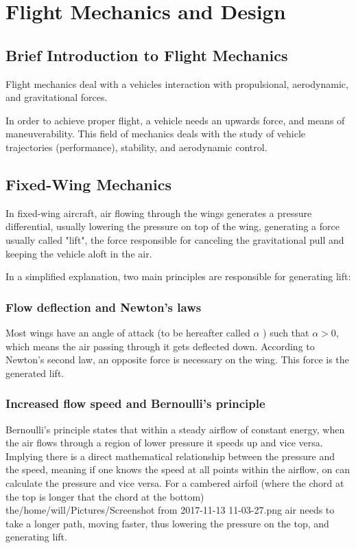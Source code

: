 
\chapter{Flight Mechanics and Design} \label{chap:FlightMechanics}

\section{Brief Introduction to Flight Mechanics}

Flight mechanics deal with a vehicles interaction with propulsional, aerodynamic, and gravitational forces.

In order to achieve proper flight, a vehicle needs an upwards force, and means of maneuverability. 
%
This field of mechanics deals with the study of vehicle trajectories (performance), stability, and aerodynamic
control.


\section{Fixed-Wing Mechanics}

In fixed-wing aircraft, air flowing through the wings generates a pressure differential, usually lowering the pressure on top of the wing, generating a force usually called "lift", the force responsible for canceling the gravitational pull and keeping the vehicle aloft in the air.

In a simplified explanation, two main principles are responsible for generating lift:

\subsection{Flow deflection and Newton's laws}

Most wings have an angle of attack (to be hereafter called $\alpha$ ) such that $\alpha > 0$, which means the air passing through it gets deflected down. According to Newton's second law, an opposite force is necessary on the wing. This force is the generated lift.

\subsection{Increased flow speed and Bernoulli's principle}

Bernoulli's principle states that within a steady airflow of constant energy, when the air flows through a region of lower pressure it speeds up and vice versa. Implying there is a direct mathematical relationship between the pressure and the speed, meaning if one knows the speed at all points within the airflow, on can calculate the pressure and vice versa. For a cambered airfoil (where the chord at the top is longer that the chord at the bottom) the/home/will/Pictures/Screenshot from 2017-11-13 11-03-27.png air needs to take a longer path, moving faster, thus lowering the pressure on the top, and generating lift.



